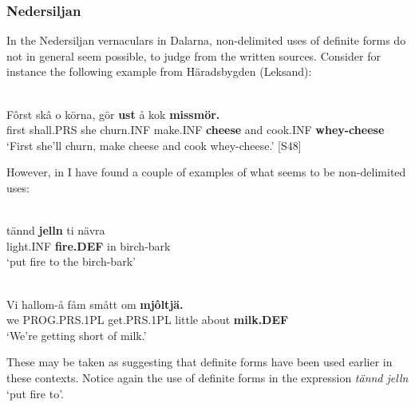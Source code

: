 \subsubsection{Nedersiljan}
 In the Nedersiljan vernaculars in Dalarna, non-delimited uses of definite forms do not in general seem possible, to judge from the written sources. Consider for instance the following example from Häradsbygden (Leksand):

\ea \label{} 
\\
\gll Fôrst  skâ  o  körna,  gör  \textbf{ust} å  kok  \textbf{missmör.} \\
first  shall.PRS  she  churn.INF  make.INF  \textbf{cheese} and  cook.INF  \textbf{whey-cheese} \\
\glt ‘First she’ll churn, make cheese and cook whey-cheese.’ [S48]

\z

However, in \citet{LevanderEtAl1961-} I have found a couple of examples of what seems to be non-delimited uses:


\ea \label{} 
\\
\gll tännd  \textbf{jelln} ti  nävra\\
light.INF  \textbf{fire.DEF} in  birch-bark\\
\glt ‘put fire to the birch-bark’

\z

\ea \label{} 
\\
\gll Vi  hallom-å  fåm  smått  om  \textbf{mjôltjä.}\\
we  PROG.PRS.1PL  get.PRS.1PL  little  about  \textbf{milk.DEF}\\
\glt ‘We’re getting short of milk.’

\z

These may be taken as suggesting that definite forms have been used earlier in these contexts.  Notice again the use of definite forms in the expression \textit{tännd jelln} ‘put fire to’.


